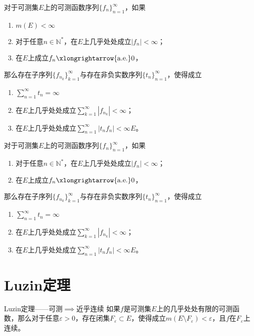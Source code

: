 \documentclass[lang = cn, scheme = chinese, thmcnt = section]{elegantbook}
\newcommand{\N}{\mathbb{N}}            %
\newcommand{\sub}{\subset}             %
\newcommand{\dis}{\displaystyle}
\newcommand{\toae}{\xlongrightarrow{\mathrm{a.e.}}}
\begin{document}
\begin{exercise}
	对于可测集$E$上的可测函数序列$\{f_n\}_{n=1}^{\infty}$，如果
	\begin{enumerate}
		\item $m(E)<\infty$
		\item 对于任意$n\in\N^*$，在$E$上几乎处处成立$|f_n|<\infty$；
		\item 在$E$上成立$f_n\toae 0$，
	\end{enumerate}
	那么存在子序列$\{ f_{n_k} \}_{k=1}^{\infty}$与存在非负实数序列$\{ t_n \}_{n=1}^{\infty}$，使得成立
	\begin{enumerate}
		\item $\dis \sum_{n=1}^{\infty}t_n=\infty$
		\item 在$E$上几乎处处成立$\dis\sum_{k=1}^{\infty}|f_{n_k}|<\infty$；
		\item 在$E$上几乎处处成立$\dis \sum_{n=1}^{\infty}{|t_n f_n|}<\infty E$。
	\end{enumerate}
\end{exercise}

\begin{exercise}
	对于可测集$E$上的可测函数序列$\{f_n\}_{n=1}^{\infty}$，如果
	\begin{enumerate}
		\item 对于任意$n\in\N^*$，在$E$上几乎处处成立$|f_n|<\infty$；
		\item 在$E$上成立$f_n\toae 0$，
	\end{enumerate}
	那么存在子序列$\{ f_{n_k} \}_{k=1}^{\infty}$与存在非负实数序列$\{ t_n \}_{n=1}^{\infty}$，使得成立
	\begin{enumerate}
		\item $\dis \sum_{n=1}^{\infty}t_n=\infty$
		\item 在$E$上几乎处处成立$\dis\sum_{k=1}^{\infty}|f_{n_k}|<\infty$；
		\item 在$E$上几乎处处成立$\dis \sum_{n=1}^{\infty}{|t_n f_n|}<\infty E$。
	\end{enumerate}
\end{exercise}

\section{Luzin定理}

\begin{theorem}{Luzin定理——可测$\implies$近乎连续}
	如果$f$是可测集$E$上的几乎处处有限的可测函数，那么对于任意$\varepsilon>0$，存在闭集$F_\varepsilon\sub E$，使得成立$m(E\setminus F_\varepsilon)<\varepsilon$，且$f$在$F_\varepsilon$上连续。
\end{theorem}
\end{document}

